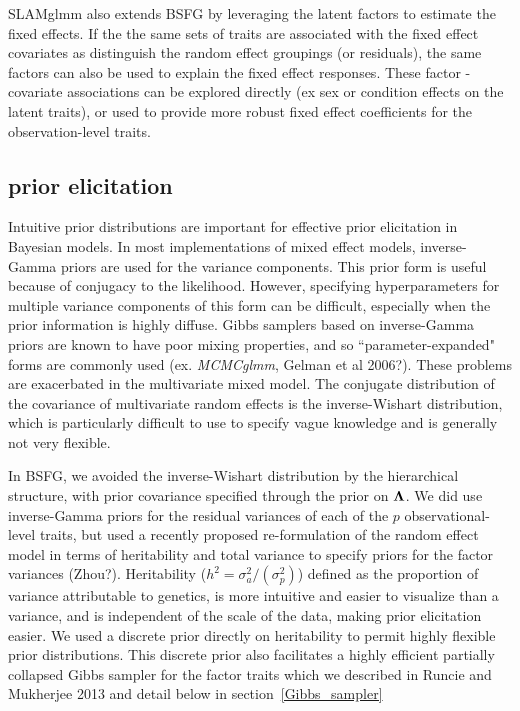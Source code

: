 \documentclass[11pt]{amsart}
\newcommand*{\B}[1]{\ifmmode\bm{#1}\else\textbf{#1}\fi}
\begin{document}
SLAMglmm also extends BSFG by leveraging the latent factors to estimate the fixed effects. If the the same sets of traits are associated with the fixed effect covariates as distinguish the random effect groupings (or residuals), the same factors can also be used to explain the fixed effect responses. These factor - covariate associations can be explored directly (ex sex or condition effects on the latent traits), or used to provide more robust fixed effect coefficients for the observation-level traits.

\subsection{prior elicitation}
\label{random_effect_priors}
Intuitive prior distributions are important for effective prior elicitation in Bayesian models. In most implementations of mixed effect models, inverse-Gamma priors are used for the variance components. This prior form is useful because of conjugacy to the likelihood. However, specifying hyperparameters for multiple variance components of this form can be difficult, especially when the prior information is highly diffuse. Gibbs samplers based on inverse-Gamma priors are known to have poor mixing properties, and so ``parameter-expanded" forms are commonly used (ex. \emph{MCMCglmm}, Gelman et al 2006?). These problems are exacerbated in the multivariate mixed model. The conjugate distribution of the covariance of multivariate random effects is the inverse-Wishart distribution, which is particularly difficult to use to specify vague knowledge and is generally not very flexible.

In BSFG, we avoided the inverse-Wishart distribution by the hierarchical structure, with prior covariance specified through the prior on $\B{\Lambda}$. We did use inverse-Gamma priors for the residual variances of each of the $p$ observational-level traits, but used a recently proposed re-formulation of the random effect model in terms of heritability and total variance to specify priors for the factor variances (Zhou?). Heritability ($h^2 = \sigma^2_a / (\sigma^2_p)$) defined as the proportion of variance attributable to genetics, is more intuitive and easier to visualize than a variance, and is independent of the scale of the data, making prior elicitation easier. We used a discrete prior directly on heritability to permit highly flexible prior distributions. This discrete prior also facilitates a highly efficient partially collapsed Gibbs sampler for the factor traits which we described in Runcie and Mukherjee 2013 and detail below in section~\ref{Gibbs_sampler}
\end{document}
